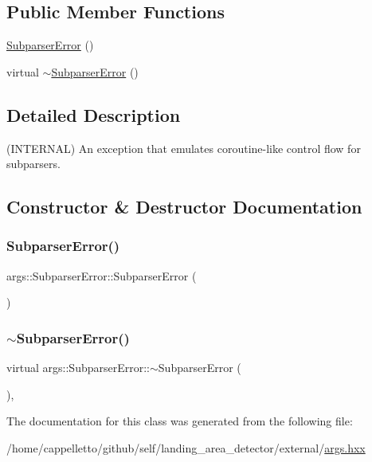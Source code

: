 \subsection*{Public Member Functions}
\begin{DoxyCompactItemize}
\item 
\hyperlink{classargs_1_1_subparser_error_a790d7d17f82aa9c3048e1aaa3058aab4}{Subparser\+Error} ()
\item 
virtual \hyperlink{classargs_1_1_subparser_error_af8ecb9b71d5e520160446509453dad09}{$\sim$\+Subparser\+Error} ()
\end{DoxyCompactItemize}


\subsection{Detailed Description}
(I\+N\+T\+E\+R\+N\+AL) An exception that emulates coroutine-\/like control flow for subparsers. 

\subsection{Constructor \& Destructor Documentation}
\mbox{\label{classargs_1_1_subparser_error_a790d7d17f82aa9c3048e1aaa3058aab4}} 
\subsubsection{\texorpdfstring{Subparser\+Error()}{SubparserError()}}
{\footnotesize\ttfamily args\+::\+Subparser\+Error\+::\+Subparser\+Error (\begin{DoxyParamCaption}{ }\end{DoxyParamCaption})\hspace{0.3cm}{\ttfamily [inline]}}

\mbox{\label{classargs_1_1_subparser_error_af8ecb9b71d5e520160446509453dad09}} 
\subsubsection{\texorpdfstring{$\sim$\+Subparser\+Error()}{~SubparserError()}}
{\footnotesize\ttfamily virtual args\+::\+Subparser\+Error\+::$\sim$\+Subparser\+Error (\begin{DoxyParamCaption}{ }\end{DoxyParamCaption})\hspace{0.3cm}{\ttfamily [inline]}, {\ttfamily [virtual]}}



The documentation for this class was generated from the following file\+:\begin{DoxyCompactItemize}
\item 
/home/cappelletto/github/self/landing\+\_\+area\+\_\+detector/external/\hyperlink{args_8hxx}{args.\+hxx}\end{DoxyCompactItemize}
